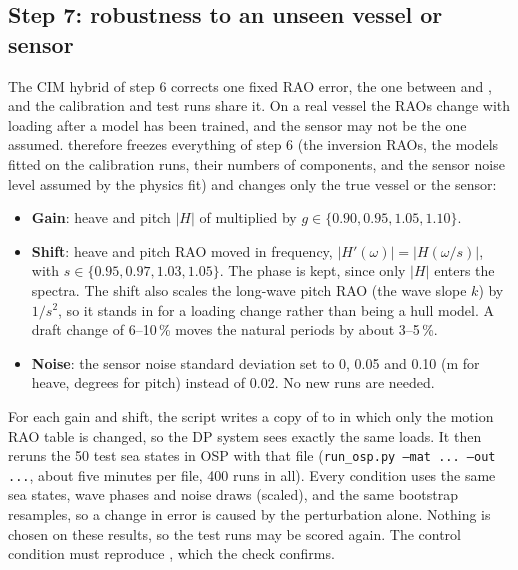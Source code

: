 \documentclass[11pt,a4paper]{article}
\begin{document}
\subsection{Step 7: robustness to an unseen vessel or sensor}
\label{sec:step7}

The CIM hybrid of step 6 corrects one fixed RAO error, the one between
 and , and the calibration and test runs share
it. On a real vessel the RAOs change with loading after a model has been trained, and the sensor
may not be the one assumed.  therefore freezes everything of step 6 (the
inversion RAOs, the models fitted on the calibration runs, their numbers of components, and the
sensor noise level assumed by the physics fit) and changes only the true vessel or the sensor:
\begin{itemize}
  \item \textbf{Gain}: heave and pitch $|H|$ of  multiplied by
        $g \in \{0.90, 0.95, 1.05, 1.10\}$.
  \item \textbf{Shift}: heave and pitch RAO moved in frequency, $|H'(\omega)| = |H(\omega/s)|$,
        with $s \in \{0.95, 0.97, 1.03, 1.05\}$. The phase is kept, since only $|H|$ enters the
        spectra. The shift also scales the long-wave pitch RAO (the wave slope $k$) by $1/s^2$, so it
        stands in for a loading change rather than being a hull model. A draft change of
        6--10\,\% moves the natural periods by about 3--5\,\%.
  \item \textbf{Noise}: the sensor noise standard deviation set to 0, 0.05 and 0.10 (m for
        heave, degrees for pitch) instead of 0.02. No new runs are needed.
\end{itemize}
For each gain and shift, the script writes a copy of  to  in
which only the motion RAO table is changed, so the DP system sees exactly the same loads. It then
reruns the 50 test sea states in OSP with that file (\texttt{run\_osp.py --mat ... --out ...},
about five minutes per file, 400 runs in all). Every condition uses the same sea states, wave
phases and noise draws (scaled), and the same bootstrap resamples, so a change in error is caused
by the perturbation alone. Nothing is chosen on these results, so the test runs may be scored
again. The control condition must reproduce , which the check confirms.
\end{document}
